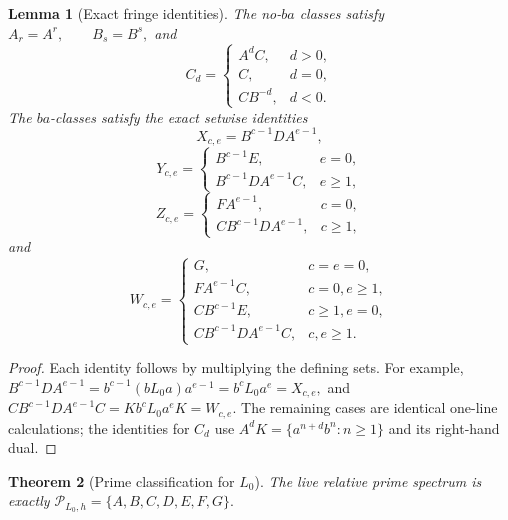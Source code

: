 \documentclass[11pt,a4paper]{article}
\newtheorem{theorem}{Theorem}[section]
\newtheorem{lemma}[theorem]{Lemma}
\newcommand{\Pcal}{\mathcal P}
\begin{document}
\begin{lemma}[Exact fringe identities]
\label{lem:L0-fringe-identities}
The no-$ba$ classes satisfy
\(A_r=A^r, \qquad B_s=B^s,\)
and
\begin{equation}
  C_d=
  \begin{cases}
  A^dC,&d>0,\\
  C,&d=0,\\
  CB^{-d},&d<0.
  \end{cases}
  \label{eq:L0-Cd}
\end{equation}
The $ba$-classes satisfy the exact setwise identities
\begin{equation}
  X_{c,e}=B^{c-1}DA^{e-1},
  \label{eq:L0-X}
\end{equation}
\begin{equation}
  Y_{c,e}=
  \begin{cases}
  B^{c-1}E,&e=0,\\
  B^{c-1}DA^{e-1}C,&e\ge1,
  \end{cases}
  \label{eq:L0-Y}
\end{equation}
\begin{equation}
  Z_{c,e}=
  \begin{cases}
  FA^{e-1},&c=0,\\
  CB^{c-1}DA^{e-1},&c\ge1,
  \end{cases}
  \label{eq:L0-Z}
\end{equation}
and
\begin{equation}
  W_{c,e}=
  \begin{cases}
  G,&c=e=0,\\
  FA^{e-1}C,&c=0,e\ge1,\\
  CB^{c-1}E,&c\ge1,e=0,\\
  CB^{c-1}DA^{e-1}C,&c,e\ge1.
  \end{cases}
  \label{eq:L0-W}
\end{equation}
\end{lemma}

\begin{proof}
Each identity follows by multiplying the defining sets.  For example,
\(B^{c-1}DA^{e-1} =b^{c-1}(bL_0a)a^{e-1} =b^cL_0a^e=X_{c,e},\)
and
\(CB^{c-1}DA^{e-1}C =Kb^cL_0a^eK=W_{c,e}.\)
The remaining cases are identical one-line calculations; the identities
for $C_d$ use $A^dK=\{a^{n+d}b^n:n\ge1\}$ and its right-hand dual.
\end{proof}

\begin{theorem}[Prime classification for $L_0$]
\label{thm:L0-primes}
The live relative prime spectrum is exactly
\(\Pcal_{L_0,h}=\{A,B,C,D,E,F,G\}.\)
\end{theorem}
\end{document}
